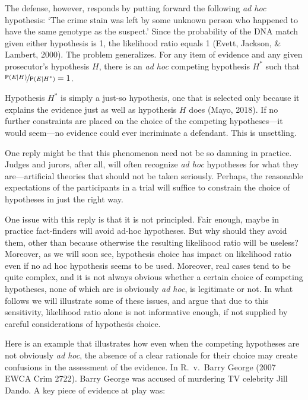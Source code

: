 \documentclass[
  10pt,
  dvipsnames,enabledeprecatedfontcommands]{scrartcl}
\newcommand{\pr}[1]{\mathsf{P}(#1)}
\begin{document}
The defense, however, responds by putting forward the following
\textit{ad hoc} hypothesis: `The crime stain was left by some unknown
person who happened to have the same genotype as the suspect.' Since the
probability of the DNA match given either hypothesis is 1, the
likelihood ratio equals 1 (Evett, Jackson, \& Lambert, 2000). The
problem generalizes. For any item of evidence and any given prosecutor's
hypothesis \(H\), there is an \textit{ad hoc} competing hypothesis
\(H^*\) such that \(\nicefrac{\pr{E \vert H}}{\pr{E \vert H^*}}=1\).

Hypothesis \(H^*\) is simply a just-so hypothesis, one that is selected
only because it explains the evidence just as well as hypothesis \(H\)
does (Mayo, 2018). If no further constraints are placed on the choice of
the competing hypotheses---it would seem---no evidence could ever
incriminate a defendant. This is unsettling.

One reply might be that this phenomenon need not be so damning in
practice. Judges and jurors, after all, will often recognize
\textit{ad hoc} hypotheses for what they are---artificial theories that
should not be taken seriously. Perhaps, the reasonable expectations of
the participants in a trial will suffice to constrain the choice of
hypotheses in just the right way.

One issue with this reply is that it is not principled. Fair enough,
maybe in practice fact-finders will avoid ad-hoc hypotheses. But why
should they avoid them, other than because otherwise the resulting
likelihood ratio will be useless? Moreover, as we will soon see,
hypothesis choice has impact on likelihood ratio even if no ad hoc
hypothesis seems to be used. Moreover, real cases tend to be quite
complex, and it is not always obvious whether a certain choice of
competing hypotheses, none of which are is obviously \textit{ad hoc}, is
legitimate or not. In what follows we will illustrate some of these
issues, and argue that due to this sensitivity, likelihood ratio alone
is not informative enough, if not supplied by careful considerations of
hypothesis choice.

Here is an example that illustrates how even when the competing
hypotheses are not obviously \textit{ad hoc}, the absence of a clear
rationale for their choice may create confusions in the assessment of
the evidence. In R.~v.~Barry George (2007 EWCA Crim 2722). Barry George
was accused of murdering TV celebrity Jill Dando. A key piece of
evidence at play was: \vspace{2mm}
\end{document}
